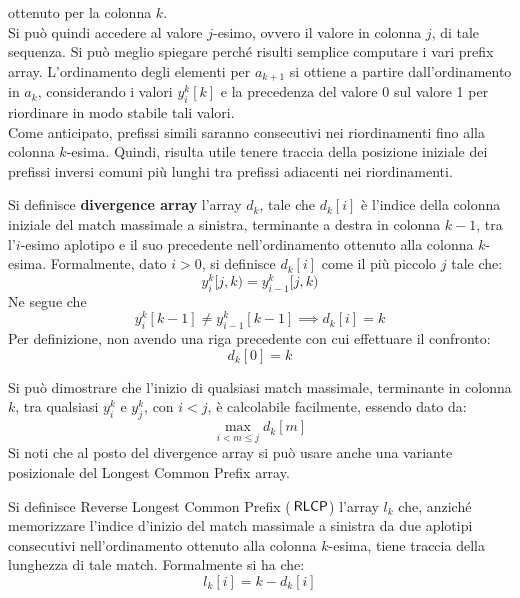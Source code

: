 ottenuto per la colonna $k$. \\
Si può quindi accedere al valore $j$-esimo, ovvero
il valore in colonna $j$, di tale
sequenza. Si può meglio spiegare perché risulti 
semplice computare i vari prefix array. L'ordinamento degli elementi per
$a_{k+1}$ si ottiene a partire 
dall'ordinamento in $a_k$, considerando i valori $y_i^k[k]$ e la
precedenza del valore 0 sul valore 1 per riordinare in modo stabile tali
valori.\\ 
Come anticipato, prefissi simili saranno consecutivi nei riordinamenti fino alla
colonna $k$-esima. Quindi, risulta utile tenere traccia della posizione iniziale
dei prefissi inversi comuni più lunghi tra prefissi adiacenti nei riordinamenti. 
\begin{definizione}
  Si definisce \textbf{divergence array} l'array $d_k$, tale che $d_k[i]$ è
  l'indice della colonna iniziale del match massimale a sinistra, terminante
  a destra in colonna
  $k-1$, tra 
  l'$i$-esimo aplotipo e il suo precedente nell'ordinamento ottenuto alla
  colonna $k$-esima. Formalmente, dato $i>0$, si definisce 
  $d_k[i]$ come il più piccolo $j$ tale che:
  \begin{equation}
    \label{eq:pbwtdiv}
    y_i^k[j,k)=y_{i-1}^k[j,k)
  \end{equation}
  Ne segue che
  \begin{equation}
    \label{eq:pbwtdiv2}
    y_i^k[k-1]\neq y_{i-1}^k[k-1] \implies d_k[i]=k
  \end{equation}
  Per definizione, non avendo una riga precedente con cui effettuare il
  confronto: 
  \begin{equation}
    \label{eq:pbwtdiv3}
   d_k[0]=k
  \end{equation}
\end{definizione}
Si può dimostrare che l'inizio di qualsiasi match massimale, terminante
in colonna $k$, tra qualsiasi $y_i^k$ e $y_j^k$, con $i<j$, è calcolabile
facilmente, essendo dato da:
\begin{equation}
  \label{eq:pbwtint}
  \max_{i<m\leq j}d_k[m]
\end{equation}
Si noti che al posto del divergence array si può usare anche una
variante posizionale del Longest Common Prefix array.
\begin{definizione}
  Si definisce Reverse Longest Common Prefix ($\,\mbox{\rm {\sf RLCP}}$) l'array $l_k$
  che, anziché 
  memorizzare l'indice d'inizio del match massimale a sinistra da due aplotipi
  consecutivi nell'ordinamento ottenuto alla colonna $k$-esima, tiene traccia
  della lunghezza di tale match. Formalmente si ha che:
  \begin{equation}
    \label{eq:pbwtlcp}
    l_k[i]=k-d_k[i]
  \end{equation}
\end{definizione}
